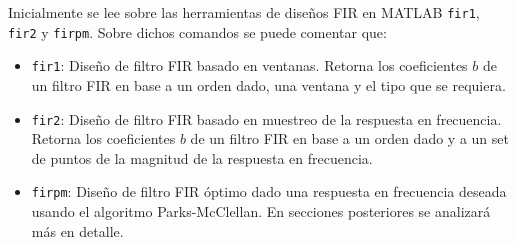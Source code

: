 
Inicialmente se lee sobre las herramientas de diseños FIR en MATLAB \texttt{fir1}, \texttt{fir2} y \texttt{firpm}. Sobre dichos comandos se puede comentar que:
\begin{itemize}
    \item \texttt{fir1}: Diseño de filtro FIR basado en ventanas. Retorna los coeficientes $b$ de un filtro FIR en base a un orden dado, una ventana y el tipo que se requiera. 
    \item \texttt{fir2}: Diseño de filtro FIR basado en muestreo de la respuesta en frecuencia. Retorna los coeficientes $b$ de un filtro FIR en base a un orden dado y a un set de puntos de la magnitud de la respuesta en frecuencia. 
    \item \texttt{firpm}: Diseño de filtro FIR óptimo dado una respuesta en frecuencia deseada usando el algoritmo Parks-McClellan. En secciones posteriores se analizará más en detalle.
\end{itemize}

